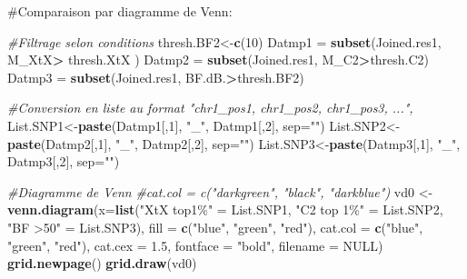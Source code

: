 \documentclass[
  openany]{book}
\newenvironment{Shaded}{\begin{snugshade}}{\end{snugshade}}
\newcommand{\AttributeTok}[1]{\textcolor[rgb]{0.13,0.29,0.53}{#1}}
\newcommand{\CommentTok}[1]{\textcolor[rgb]{0.56,0.35,0.01}{\textit{#1}}}
\newcommand{\ConstantTok}[1]{\textcolor[rgb]{0.56,0.35,0.01}{#1}}
\newcommand{\DecValTok}[1]{\textcolor[rgb]{0.00,0.00,0.81}{#1}}
\newcommand{\FloatTok}[1]{\textcolor[rgb]{0.00,0.00,0.81}{#1}}
\newcommand{\FunctionTok}[1]{\textcolor[rgb]{0.13,0.29,0.53}{\textbf{#1}}}
\newcommand{\NormalTok}[1]{#1}
\newcommand{\OtherTok}[1]{\textcolor[rgb]{0.56,0.35,0.01}{#1}}
\newcommand{\SpecialCharTok}[1]{\textcolor[rgb]{0.81,0.36,0.00}{\textbf{#1}}}
\newcommand{\StringTok}[1]{\textcolor[rgb]{0.31,0.60,0.02}{#1}}
\theoremstyle{definition}
\theoremstyle{definition}
\theoremstyle{definition}
\theoremstyle{definition}
\theoremstyle{remark}
\begin{document}
\#Comparaison par diagramme de Venn:

\begin{Shaded}
\begin{Highlighting}[]
\CommentTok{\#Filtrage selon conditions}
\NormalTok{thresh.BF2}\OtherTok{\textless{}{-}}\FunctionTok{c}\NormalTok{(}\DecValTok{10}\NormalTok{)}
\NormalTok{Datmp1 }\OtherTok{=} \FunctionTok{subset}\NormalTok{(Joined.res1, M\_XtX}\SpecialCharTok{\textgreater{}}\NormalTok{ thresh.XtX )}
\NormalTok{Datmp2 }\OtherTok{=} \FunctionTok{subset}\NormalTok{(Joined.res1, M\_C2}\SpecialCharTok{\textgreater{}}\NormalTok{thresh.C2)}
\NormalTok{Datmp3 }\OtherTok{=} \FunctionTok{subset}\NormalTok{(Joined.res1, BF.dB.}\SpecialCharTok{\textgreater{}}\NormalTok{thresh.BF2)}

\CommentTok{\#Conversion en liste au format "chr1\_pos1, chr1\_pos2, chr1\_pos3, ...", }
\NormalTok{List.SNP1}\OtherTok{\textless{}{-}}\FunctionTok{paste}\NormalTok{(Datmp1[,}\DecValTok{1}\NormalTok{], }\StringTok{"\_"}\NormalTok{, Datmp1[,}\DecValTok{2}\NormalTok{], }\AttributeTok{sep=}\StringTok{""}\NormalTok{)}
\NormalTok{List.SNP2}\OtherTok{\textless{}{-}}\FunctionTok{paste}\NormalTok{(Datmp2[,}\DecValTok{1}\NormalTok{], }\StringTok{"\_"}\NormalTok{, Datmp2[,}\DecValTok{2}\NormalTok{], }\AttributeTok{sep=}\StringTok{""}\NormalTok{)}
\NormalTok{List.SNP3}\OtherTok{\textless{}{-}}\FunctionTok{paste}\NormalTok{(Datmp3[,}\DecValTok{1}\NormalTok{], }\StringTok{"\_"}\NormalTok{, Datmp3[,}\DecValTok{2}\NormalTok{], }\AttributeTok{sep=}\StringTok{""}\NormalTok{)}
\end{Highlighting}
\end{Shaded}

\begin{Shaded}
\begin{Highlighting}[]
\CommentTok{\#Diagramme de Venn}
\CommentTok{\#cat.col = c("darkgreen", "black", "darkblue")}
\NormalTok{vd0 }\OtherTok{\textless{}{-}} \FunctionTok{venn.diagram}\NormalTok{(}\AttributeTok{x=}\FunctionTok{list}\NormalTok{(}\StringTok{"XtX top1\%"} \OtherTok{=}\NormalTok{ List.SNP1, }\StringTok{"C2 top 1\%"} \OtherTok{=}\NormalTok{ List.SNP2, }\StringTok{"BF \textgreater{}50"} \OtherTok{=}\NormalTok{ List.SNP3), }\AttributeTok{fill =} \FunctionTok{c}\NormalTok{(}\StringTok{"blue"}\NormalTok{, }\StringTok{"green"}\NormalTok{, }\StringTok{"red"}\NormalTok{), }\AttributeTok{cat.col =} \FunctionTok{c}\NormalTok{(}\StringTok{"blue"}\NormalTok{, }\StringTok{"green"}\NormalTok{, }\StringTok{"red"}\NormalTok{), }\AttributeTok{cat.cex =} \FloatTok{1.5}\NormalTok{, }\AttributeTok{fontface =} \StringTok{"bold"}\NormalTok{, }\AttributeTok{filename =} \ConstantTok{NULL}\NormalTok{)}
\FunctionTok{grid.newpage}\NormalTok{()}
\FunctionTok{grid.draw}\NormalTok{(vd0)}
\end{Highlighting}
\end{Shaded}
\end{document}
